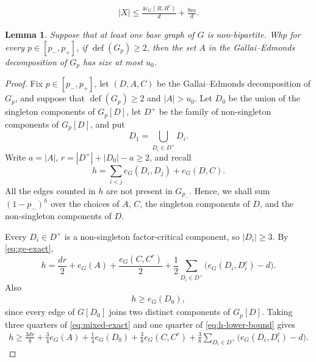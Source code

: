 \documentclass[10pt,a4paper]{amsart}
\newtheorem{lemma}{Lemma}
\newcommand{\defi}{\operatorname{def}}
\begin{document}
\begin{align} \label{eq:size-X}
    |X| \leq \frac{4 e_G(R, R^c)}{d} + \frac{8m}{d}.
\end{align}

\begin{lemma}\label{lem:nonbipartite-ge}
Suppose that at least one base graph of $G$ is non-bipartite.
Whp for every $p\in[p_-,p_+]$, if $\defi(G_p)\ge2$, then the set $A$ in the Gallai--Edmonds decomposition of $G_p$ has size at most $u_0$.
\end{lemma}

\begin{proof}
Fix $p\in[p_-,p_+]$, let $(D,A,C)$ be the Gallai--Edmonds decomposition of $G_p$, and suppose that $\defi(G_p)\ge2$ and $|A|>u_0$.
Let $D_0$ be the union of the singleton components of $G_p[D]$, let $D^+$ be the family of non-singleton components of $G_p[D]$, and put
\[
 D_1=\bigcup_{D_i \in D^+} D_i.
\]
Write $a=|A|$, $r=|D^+|+|D_0|-a\ge2$, and recall
\[
 h=\sum_{i<j}e_G(D_i,D_j)+e_G(D,C).
\]
All the edges counted in $h$ are not present in $G_{p_-}$.
Hence, we shall sum $(1-p_-)^h$ over the choices of $A$, $C$, the singleton components of $D$, and the non-singleton components of $D$.

Every $D_i\in D^+$ is a non-singleton factor-critical component, so $|D_i|\ge3$.
By \eqref{eq:ge-exact},
\begin{equation}\label{eq:mixed-exact}
 h=\frac{dr}{2}+e_G(A)+\frac{e_G(C, C^c)}{2}
   +\frac{1}{2}\sum_{D_i\in D^+}\bigl(e_G(D_i, D_i^c)-d\bigr).
\end{equation}
Also 
\begin{align} \label{eq:h-lower-bound}
    h\ge e_G(D_0),
\end{align}
since every edge of $G[D_0]$ joins two distinct components of $G_p[D]$.
Taking three quarters of \eqref{eq:mixed-exact} and one quarter of \eqref{eq:h-lower-bound} gives
\begin{align} \label{eq:combined-LB-h}
     h\ge\frac{3dr}{8}+\frac34e_G(A)+\frac14e_G(D_0)  +\frac38 e_G(C, C^c)
 +\frac38\sum_{D_i\in D^+}\bigl(e_G(D_i, D_i^c)-d\bigr).
\end{align}


\end{proof}
\end{document}
